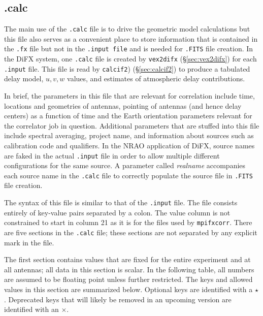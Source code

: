
\subsection{.calc} \label{sec:calc}

The main use of the {\tt .calc} file is to drive the geometric model calculations but this file also serves as a convenient place to store information that is contained in the {\tt .fx} file but not in the {\tt .input file} and is needed for {\tt .FITS} file creation.
In the DiFX system, one {\tt .calc} file is created by {\tt vex2difx} (\S\ref{sec:vex2difx}) for each {\tt .input} file.
This file is read by {\tt calcif2}) (\S\ref{sec:calcif2}) to produce a tabulated delay model, $u, v, w$ values, and estimates of atmospheric delay contributions.

In brief, the parameters in this file that are relevant for correlation include time, locations and geometries of antennas, pointing of antennas (and hence delay centers) as a function of time and the Earth orientation parameters relevant for the correlator job in question.
Additional parameters that are stuffed into this file include spectral averaging, project name, and information about sources such as calibration code and qualifiers.
In the NRAO application of DiFX, source names are faked in the actual {\tt .input} file in order to allow multiple different configurations for the same source.
A parameter called {\em realname} accompanies each source name in the {\tt .calc} file to correctly populate the source file in {\tt .FITS} file creation.

The syntax of this file is similar to that of the {\tt .input} file.
The file consists entirely of key-value pairs separated by a colon.
The value column is not constrained to start in column 21 as it is for the files used by {\tt mpifxcorr}.
There are five sections in the {\tt .calc} file; these sections are not separated by any explicit mark in the file.

The first section contains values that are fixed for the entire experiment and at all antennas; all data in this section is scalar.
In the following table, all numbers are assumed to be floating point unless further restricted.
The keys and allowed values in this section are summarized below.
Optional keys are identified with a $\star$.
Deprecated keys that will likely be removed in an upcoming version are identified with an $\times$.

